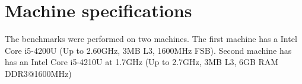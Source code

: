 \section*{Machine specifications}
The benchmarks were performed on two machines. The first machine has a Intel Core i5-4200U (Up to 2.60GHz, 3MB L3, 1600MHz FSB). Second machine has has an Intel Core i5-4210U at 1.7GHz (Up to 2.7GHz, 3MB L3, 6GB RAM DDR3@1600MHz)